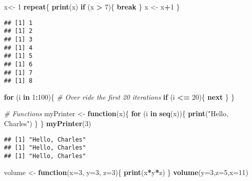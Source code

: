 \documentclass[
]{article}
\newenvironment{Shaded}{\begin{snugshade}}{\end{snugshade}}
\newcommand{\AttributeTok}[1]{\textcolor[rgb]{0.13,0.29,0.53}{#1}}
\newcommand{\CommentTok}[1]{\textcolor[rgb]{0.56,0.35,0.01}{\textit{#1}}}
\newcommand{\ControlFlowTok}[1]{\textcolor[rgb]{0.13,0.29,0.53}{\textbf{#1}}}
\newcommand{\DecValTok}[1]{\textcolor[rgb]{0.00,0.00,0.81}{#1}}
\newcommand{\FunctionTok}[1]{\textcolor[rgb]{0.13,0.29,0.53}{\textbf{#1}}}
\newcommand{\NormalTok}[1]{#1}
\newcommand{\OtherTok}[1]{\textcolor[rgb]{0.56,0.35,0.01}{#1}}
\newcommand{\SpecialCharTok}[1]{\textcolor[rgb]{0.81,0.36,0.00}{\textbf{#1}}}
\newcommand{\StringTok}[1]{\textcolor[rgb]{0.31,0.60,0.02}{#1}}
\begin{document}
\begin{Shaded}
\begin{Highlighting}[]
\NormalTok{x}\OtherTok{\textless{}{-}} \DecValTok{1}
\ControlFlowTok{repeat}\NormalTok{\{}
\FunctionTok{print}\NormalTok{(x)}
\ControlFlowTok{if}\NormalTok{ (x }\SpecialCharTok{\textgreater{}} \DecValTok{7}\NormalTok{)\{}
\ControlFlowTok{break}
\NormalTok{\}}
\NormalTok{x }\OtherTok{\textless{}{-}}\NormalTok{ x}\SpecialCharTok{+}\DecValTok{1}
\NormalTok{\}}
\end{Highlighting}
\end{Shaded}

\begin{verbatim}
## [1] 1
## [1] 2
## [1] 3
## [1] 4
## [1] 5
## [1] 6
## [1] 7
## [1] 8
\end{verbatim}

\begin{Shaded}
\begin{Highlighting}[]
\ControlFlowTok{for}\NormalTok{ (i }\ControlFlowTok{in} \DecValTok{1}\SpecialCharTok{:}\DecValTok{100}\NormalTok{)\{}
\CommentTok{\# Over ride the first 20 iterations}
\ControlFlowTok{if}\NormalTok{ (i }\SpecialCharTok{\textless{}=} \DecValTok{20}\NormalTok{)\{}
\ControlFlowTok{next} 
\NormalTok{\}}
\NormalTok{\}}

\CommentTok{\# Functions}
\NormalTok{myPrinter }\OtherTok{\textless{}{-}} \ControlFlowTok{function}\NormalTok{(x)\{}
  \ControlFlowTok{for}\NormalTok{ (i }\ControlFlowTok{in} \FunctionTok{seq}\NormalTok{(x))\{}
       \FunctionTok{print}\NormalTok{(}\StringTok{"Hello, Charles"}\NormalTok{)}
\NormalTok{  \}}
\NormalTok{\}}
\FunctionTok{myPrinter}\NormalTok{(}\DecValTok{3}\NormalTok{)}
\end{Highlighting}
\end{Shaded}

\begin{verbatim}
## [1] "Hello, Charles"
## [1] "Hello, Charles"
## [1] "Hello, Charles"
\end{verbatim}

\begin{Shaded}
\begin{Highlighting}[]
\NormalTok{volume }\OtherTok{\textless{}{-}} \ControlFlowTok{function}\NormalTok{(}\AttributeTok{x=}\DecValTok{3}\NormalTok{, }\AttributeTok{y=}\DecValTok{3}\NormalTok{, }\AttributeTok{z=}\DecValTok{3}\NormalTok{)\{}
  \FunctionTok{print}\NormalTok{(x}\SpecialCharTok{*}\NormalTok{y}\SpecialCharTok{*}\NormalTok{z)}
\NormalTok{\}}
\FunctionTok{volume}\NormalTok{(}\AttributeTok{y=}\DecValTok{3}\NormalTok{,}\AttributeTok{z=}\DecValTok{5}\NormalTok{,}\AttributeTok{x=}\DecValTok{11}\NormalTok{)}
\end{Highlighting}
\end{Shaded}
\end{document}
